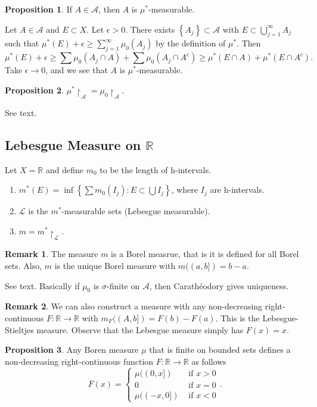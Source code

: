 \documentclass[11pt]{article}
\theoremstyle{definition}
\newtheorem{prop}{Proposition}[section]
\newtheorem{remark}{Remark}[section]
\newcommand{\set}[1]{\left\{ #1 \right\}}
\newcommand{\RR}{\mathbb{R}}
\newcommand{\m}[1]{\mathcal{#1}}
\begin{document}
\begin{prop}
  If $A\in\m{A}$, then $A$ is $\mu^*$-measurable.
\end{prop}
\proof
Let $A\in\m{A}$ and $E\subset X$. Let $\epsilon>0$. There exists $\set{A_j}\subset\m{A}$
with $E\subset \bigcup_{j=1}^\infty A_j$ such that $\mu^*(E)+\epsilon\ge\sum_{j=1}^\infty
\mu_0(A_j)$ by the definition of $\mu^*$. Then
\[
  \mu^*(E)+\epsilon \ge \sum\mu_0(A_j\cap A)+\sum\mu_0(A_j\cap A^c)
  \ge \mu^*(E\cap A) + \mu^*(E\cap A^c) .
\]
Take $\epsilon\to0$, and we see that $A$ is $\mu^*$-measurable.
\qedhere

\begin{prop}
  $\mu^*\upharpoonright_\m{A} = \mu_0\upharpoonright_\m{A}$.
\end{prop}
\proof See text.  \qedhere


\subsection{Lebesgue Measure on $\RR$}

Let $X=\RR$ and define $m_0$ to be the length of h-intervals. 
\begin{enumerate}
  \item $m^*(E)=\inf\set{\sum m_0(I_j) : E\subset\bigcup I_j}$, where $I_j$ are
  h-intervals. 
  \item $\m{L}$ is the $m^*$-measurable sets (Lebesgue measurable). 
  \item $m=m^*\upharpoonright_\m{L}$. 
\end{enumerate}

\begin{remark}
  The measure $m$ is a Borel measrue, that is it is defined for all Borel sets. Also, $m$
  is the unique Borel measure with $m((a,b])=b-a$. 
\end{remark}
\proof
See text. Basically if $\mu_0$ is $\sigma$-finite on $\m{A}$, then
Carath\'eodory gives uniqueness. 
\qedhere

\begin{remark}
We can also construct a measure with any non-decreasing right-continuous $F:\RR\to\RR$ with
$m_F((A,b])=F(b)-F(a)$. This is the Lebesgue-Stieltjes measure. Observe that the Lebesgue
measure simply has $F(x)=x$. 
\end{remark}

\begin{prop}
Any Boren measure $\mu$ that is finite on bounded sets defines a non-decreasing
right-continuous function $F:\RR\to\RR$ as follows
\[
  F(x)=\begin{cases}
    \mu((0,x])  &\text{ if } x>0 \\
    0           &\text{ if } x=0 \\
    \mu((-x,0]) &\text{ if } x<0
  \end{cases} .
\]
\end{prop}
\end{document}
